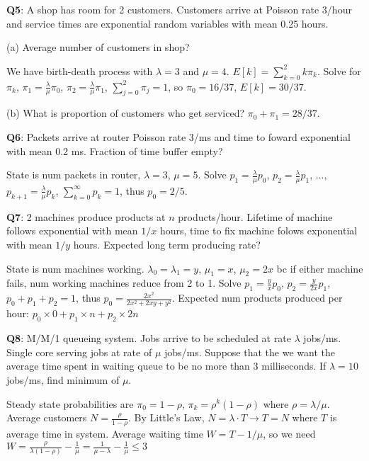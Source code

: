 \documentclass{scrartcl}
\begin{document}
\begin{multicols*}{3}
{\bf Q5}: A shop has room for 2 customers. Customers arrive at Poisson rate 3/hour and service times are exponential random variables with mean 0.25 hours.

(a) Average number of customers in shop?

We have birth-death process with $\lambda=3$ and $\mu=4$. $E[k] = \sum_{k=0}^2k\pi_k$. Solve for $\pi_k$, $\pi_1=\frac{\lambda}{\mu}\pi_0$, $\pi_2=\frac{\lambda}{\mu}\pi_1$, $\sum_{j=0}^2\pi_j=1$, so $\pi_0=16/37$, $E[k]=30/37$.

(b) What is proportion of customers who get serviced? $\pi_0+\pi_1=28/37$.



{\bf Q6}: Packets arrive at router Poisson rate 3/ms and time to foward exponential with mean 0.2 ms. Fraction of time buffer empty?

State is num packets in router, $\lambda=3$, $\mu=5$. Solve $p_1=\frac{\lambda}{\mu}p_0$, $p_2=\frac{\lambda}{\mu}p_1$, ..., $p_{k+1}=\frac{\lambda}{\mu}p_k$, $\sum_{k=0}^\infty p_k=1$, thus $p_0=2/5$.



{\bf Q7}: 2 machines produce products at $n$ products/hour. Lifetime of machine follows exponential with mean $1/x$ hours, time to fix machine folows exponential with mean $1/y$ hours. Expected long term producing rate?

State is num machines working. $\lambda_0=\lambda_1=y$, $\mu_1=x$, $\mu_2=2x$ bc if either machine fails, num working machines reduce from 2 to 1. Solve $p_1=\frac{y}{x}p_0$, $p_2=\frac{y}{2x}p_1$, $p_0+p_1+p_2=1$, thus $p_0=\frac{2x^2}{2x^2+2xy+y^2}$. Expected num products produced per hour: $p_0\times 0+p_1\times n+p_2\times 2n$



{\bf Q8}: M/M/1 queueing system. Jobs arrive to be scheduled at rate $\lambda$ jobs/ms. Single core serving jobs at rate of $\mu$ jobs/ms. Suppose that the we want the average time spent in waiting queue to be no more than 3 milliseconds. If $\lambda = 10$ jobs/ms, find minimum of $\mu$.

Steady state probabilities are $\pi_0 = 1 − \rho$, $\pi_k =\rho^k(1−\rho)$ where $\rho=\lambda/\mu$. Average customers $N=\frac{\rho}{1-\rho}$. By Little's Law, $N = \lambda\cdot T\to T=N$ where $T$ is average time in system. Average waiting time $W=T-1/\mu$, so we need $W=\frac{\rho}{\lambda(1-\rho)}-\frac{1}{\mu}=\frac{1}{\mu-\lambda}-\frac{1}{\mu}\leq 3$




\end{multicols*}
\end{document}
